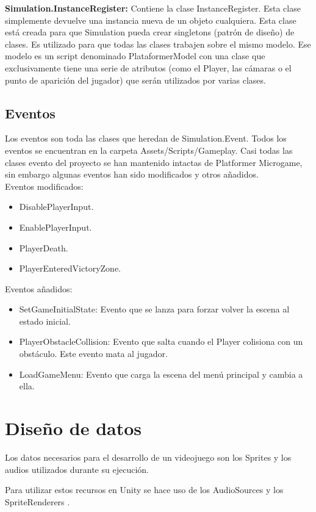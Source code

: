 \textbf{Simulation.InstanceRegister:} Contiene la clase InstanceRegister. Esta clase simplemente devuelve una instancia nueva de un objeto cualquiera. Esta clase está creada para que Simulation pueda crear singletons (patrón de diseño) de clases. Es utilizado para que todas las clases trabajen sobre el mismo modelo. Ese modelo es un script denominado PlataformerModel con una clase que exclusivamente tiene una serie de atributos (como el Player, las cámaras o el punto de aparición del jugador) que serán utilizados por varias clases.

\subsection{Eventos}
Los eventos son toda las clases que heredan de Simulation.Event. Todos los eventos se encuentran en la carpeta Assets/Scripts/Gameplay. Casi todas las clases evento del proyecto se han mantenido intactas de Platformer Microgame, sin embargo algunas eventos han sido modificados y otros añadidos.\\
Eventos modificados:
\begin{itemize}
\item
DisablePlayerInput.
\item
EnablePlayerInput.
\item
PlayerDeath.
\item
PlayerEnteredVictoryZone.
\end{itemize}

Eventos añadidos:
\begin{itemize}
\item
SetGameInitialState: Evento que se lanza para forzar volver la escena al estado inicial.
\item
PlayerObstacleCollision: Evento que salta cuando el Player colisiona con un obstáculo. Este evento mata al jugador.
\item
LoadGameMenu: Evento que carga la escena del menú principal y cambia a ella.
\end{itemize}

\section{Diseño de datos}
Los datos necesarios para el desarrollo de un videojuego son los Sprites y los audios utilizados durante su ejecución.

Para utilizar estos recursos en Unity se hace uso de los AudioSources \cite{AudioSource} y los SpriteRenderers \cite{SpriteRenderer}.

